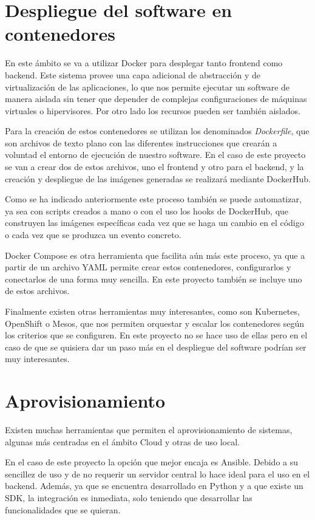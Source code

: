 \section{Despliegue del software en contenedores}

En este ámbito se va a utilizar Docker para desplegar tanto frontend como backend. Este sistema provee una capa adicional de abstracción y de virtualización de las aplicaciones, lo que nos permite ejecutar un software de manera aislada sin tener que depender de complejas configuraciones de máquinas virtuales o hipervisores. Por otro lado los recursos pueden ser también aislados.

Para la creación de estos contenedores se utilizan los denominados \textit{Dockerfile}, que son archivos de texto plano con las diferentes instrucciones que crearán a voluntad el entorno de ejecución de nuestro software. En el caso de este proyecto se van a crear dos de estos archivos, uno el frontend y otro para el backend, y la creación y despliegue de las imágenes generadas se realizará mediante DockerHub.

Como se ha indicado anteriormente este proceso también se puede automatizar, ya sea con scripts creados a mano o con el uso los hooks de DockerHub, que construyen las imágenes específicas cada vez que se haga un cambio en el código o cada vez que se produzca un evento concreto.

Docker Compose es otra herramienta que facilita aún más este proceso, ya que a partir de un archivo YAML permite crear estos contenedores, configurarlos y conectarlos de una forma muy sencilla. En este proyecto también se incluye uno de estos archivos.

Finalmente existen otras herramientas muy interesantes, como son Kubernetes, OpenShift o Mesos, que nos permiten orquestar y escalar los contenedores según los criterios que se configuren. En este proyecto no se hace uso de ellas pero en el caso de que se quisiera dar un paso más en el despliegue del software podrían ser muy interesantes.


\section{Aprovisionamiento}

Existen muchas herramientas que permiten el aprovisionamiento de sistemas, algunas más centradas en el ámbito Cloud y otras de uso local.

En el caso de este proyecto la opción que mejor encaja es Ansible. Debido a su sencillez de uso y de no requerir un servidor central lo hace ideal para el uso en el backend. Además, ya que se encuentra desarrollado en Python y a que existe un SDK, la integración es inmediata, solo teniendo que desarrollar las funcionalidades que se quieran.

